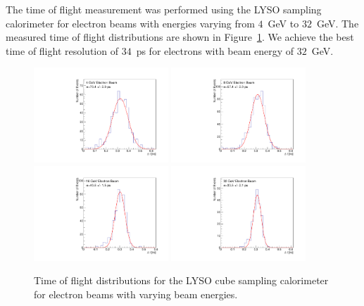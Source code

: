 \documentclass[12pt]{article}
\begin{document}
The time of flight measurement was performed using the LYSO sampling calorimeter
for electron beams with energies varying from $4$~GeV to $32$~GeV. The 
measured time of flight distributions are shown in Figure~\ref{fig:LYSOCubeTOF}.
We achieve the best time of flight resolution of $34$~ps for electrons
with beam energy of $32$~GeV.

\begin{figure}[H] \centering
\includegraphics[width=0.45\textwidth]{figs/TOF_Electron_LYSOCube_4GeV} 
\includegraphics[width=0.45\textwidth]{figs/TOF_Electron_LYSOCube_8GeV} 
\includegraphics[width=0.45\textwidth]{figs/TOF_Electron_LYSOCube_16GeV} 
\includegraphics[width=0.45\textwidth]{figs/TOF_Electron_LYSOCube_32GeV} 
\caption{ Time of flight distributions for the LYSO cube sampling calorimeter
for electron beams with varying beam energies. } 
\label{fig:LYSOCubeTOF}
\end{figure}
\end{document}
